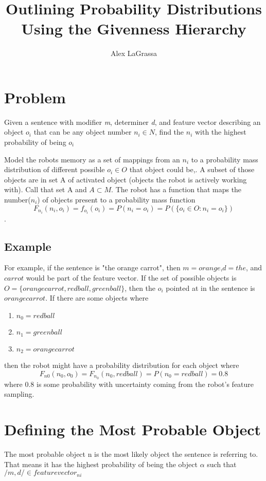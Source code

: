 \documentclass{article}
\title{Outlining Probability Distributions Using the Givenness Hierarchy}
\author{Alex LaGrassa}
\begin{document}
\maketitle

\section{Problem}
Given a sentence with modifier \emph{m}, determiner \emph{d}, and feature vector describing an object $o_i$ that can be any object number $n_i \in N$, find the $n_i$ with the highest probability of being $o_i$

 
Model the robots memory as a set of mappings from an $n_i$ to a probability mass distribution of different possible $o_i \in O$ that object could be,. A subset of those objects are in set A of activated object (objects the robot is actively working with). Call that set A and $ A \subset M $. The robot has a function that maps the number($n_i$) of objects present to a probability mass function $$F_{n_i}(n_i, o_i) =  f_{o_i}(o_i) = P( n_i = o_i) = P(\{o_i \in O: n_i = o_i\}) $$. 

\subsection{Example}
For example, if the sentence is "the orange carrot", then $m = orange$,$d = the$, and $carrot$ would be part of the feature vector. If the set of possible objects is $O = \{orange carrot, red ball, green ball\}$, then the $o_i$ pointed at in the sentence is $orange carrot$. If there are some objects where
\begin{enumerate}
\item $n_0 = red ball$
\item $n_1 = green ball$
\item $n_2 = orange carrot$
\end{enumerate}  

then the robot might have a probability distribution for each object where
$$F_{n0}(n_0, o_0) = F_{n_0}(n_0, red ball) = P(n_0 = red ball) = 0.8$$ 
where 0.8 is some probability with uncertainty coming from the robot's feature sampling.
 

\section{Defining the Most Probable Object}

The most probable object n is the most likely object the sentence is referring to. That means it has the highest probability of being the object $\alpha$ such that $/{m, d/} \in feature vector_{ni}$ 
\end{document}

